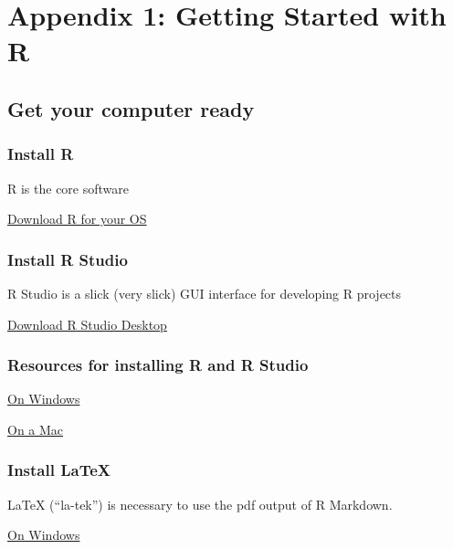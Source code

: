 \documentclass[]{book}
\begin{document}
\chapter*{Appendix 1: Getting Started with
R}\label{appendix-1-getting-started-with-r}

\section{Get your computer ready}\label{get-your-computer-ready}

\subsection{Install R}\label{install-r}

R is the core software

\href{https://cran.r-project.org}{Download R for your OS}

\subsection{Install R Studio}\label{install-r-studio}

R Studio is a slick (very slick) GUI interface for developing R projects

\href{https://www.rstudio.com/products/rstudio/download/}{Download R
Studio Desktop}

\subsection{Resources for installing R and R
Studio}\label{resources-for-installing-r-and-r-studio}

\href{https://medium.com/@GalarnykMichael/install-r-and-rstudio-on-windows-5f503f708027}{On
Windows}

\href{https://medium.com/@GalarnykMichael/install-r-and-rstudio-on-mac-e911606ce4f4}{On
a Mac}

\subsection{Install LaTeX}\label{install-latex}

LaTeX (``la-tek'') is necessary to use the pdf output of R Markdown.

\href{https://medium.com/@sorenlind/create-pdf-reports-using-r-r-markdown-latex-and-knitr-on-windows-10-952b0c48bfa9}{On
Windows}
\end{document}
